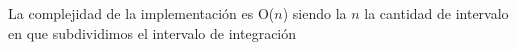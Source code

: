 La complejidad de la implementación es O($n$) siendo la $n$ la cantidad de intervalo en que subdividimos el intervalo de integración